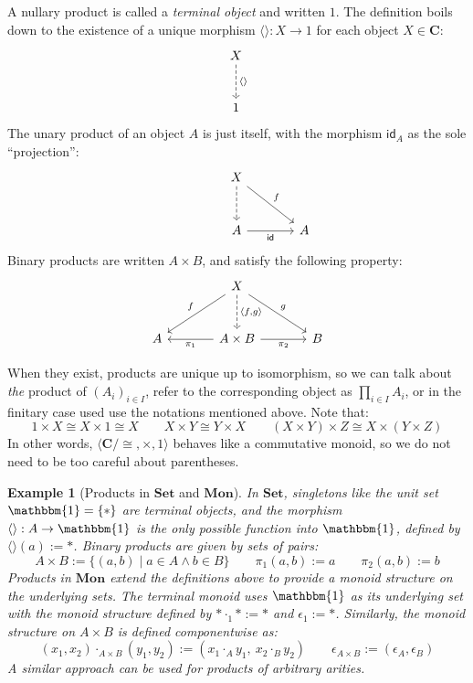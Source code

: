 \documentclass[11pt,oneside,draft]{book}
\newtheorem{example}[theorem]{Example}
\theoremstyle{definition}
\newcommand{\kw}[1]{\ensuremath{ \mathsf{#1} }}
\begin{document}
A nullary product is called a \emph{terminal object} and written $1$.
The definition boils down to the existence of
a unique morphism $\langle \rangle : X \rightarrow 1$
for each object $X \in \mathbf{C}$:
\[
  \begin{tikzcd}[sep=large]
    X \ar[d, dashed, "\langle \rangle"] \\ 1
  \end{tikzcd}
\]
The unary product of an object $A$ is just itself,
with the morphism $\kw{id}_A$ as the sole ``projection'':
\[
  \begin{tikzcd}[sep=large]
    \hspace{0.7em}
    & X \ar[d, dashed] \ar[dr, "f"] & \\
    & A \ar[r, "\kw{id}"'] & A
  \end{tikzcd}
\]
Binary products are written $A \times B$,
and satisfy the following property:
\[
  \begin{tikzcd}[sep=large]
    &
    X \ar[dl, "f"'] \ar[dr, "g"]
      \ar[d, dashed, "{\langle f, g \rangle}"] &
    \\
    A &
    A \times B \ar[l, "\pi_1"] \ar[r, "\pi_2"'] &
    B
  \end{tikzcd}
\]

When they exist, products are unique up to isomorphism,
so we can talk about \emph{the} product of $(A_i)_{i \in I}$,
refer to the corresponding object as
$
  \prod_{i \in I} A_i
$,
or in the finitary case used use the notations
mentioned above.
Note that:
\[
  1 \times X \cong X \times 1 \cong X
  \qquad
  X \times Y \cong Y \times X
  \qquad
  (X \times Y) \times Z \cong X \times (Y \times Z)
\]
In other words,
$\langle \mathbf{C} / {\cong}, {\times}, 1 \rangle$
behaves like a commutative monoid,
so we do not need to be too careful about parentheses.


\begin{example}[Products in $\mathbf{Set}$ and $\mathbf{Mon}$] %
In $\mathbf{Set}$,
singletons like the unit set $\mathbbm{1} = \{ * \}$
are terminal objects,
and the morphism $\langle \rangle : A \rightarrow \mathbbm{1}$
is the only possible function into $\mathbbm{1}$,
defined by $\langle \rangle(a) := *$.
Binary products are given by sets of pairs:
\[
  A \times B := \{ (a, b) \mid a \in A \wedge b \in B \}
  \qquad
  \pi_1(a, b) := a
  \qquad
  \pi_2(a, b) := b
\]
Products in $\mathbf{Mon}$ extend the definitions above
to provide a monoid structure on the underlying sets.
The terminal monoid uses $\mathbbm{1}$ as its underlying set
with the monoid structure
defined by ${*} \cdot_1 {*} := {*}$ and $\epsilon_1 := {*}$.
Similarly,
the monoid structure on $A \times B$ is defined componentwise as:
\[
  (x_1, x_2) \cdot_{A \times B} (y_1, y_2) :=
    (x_1 \cdot_A y_1, \: x_2 \cdot_B y_2)
  \qquad
  \epsilon_{A \times B} :=
    (\epsilon_A, \epsilon_B)
\]
A similar approach can be used for products of arbitrary arities.
\end{example}
\end{document}

